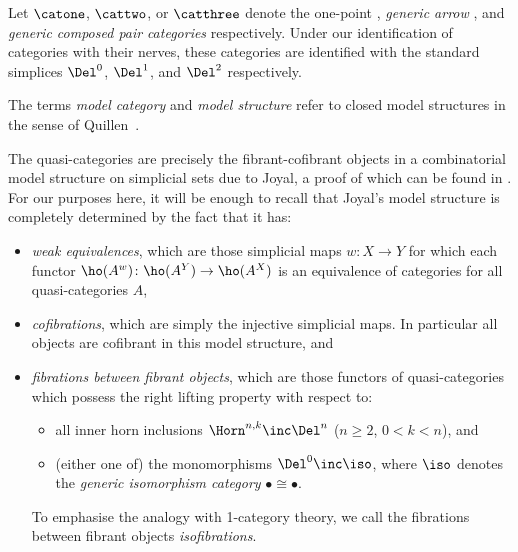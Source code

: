 \begin{ntn}
 Let $\catone$, $\cattwo$, or $\catthree$  denote the one-point \fbox{$\bullet$}, \emph{generic arrow} \fbox{$\bullet\to\bullet$}, and \emph{generic composed pair} \fbox{$\bullet\to\bullet\to\bullet$} \emph{categories} respectively. Under our identification of categories with their nerves, these categories are identified with the standard simplices $\Del^0$, $\Del^1$, and $\Del^2$ respectively.
\end{ntn}
    

The terms {\em model category\/} and {\em model structure\/}  refer to closed model structures in the sense of Quillen~\cite{Quillen:1967:Model}.

    \begin{rec}\label{rec:qmc-quasicat}
    The quasi-categories are precisely the fibrant-cofibrant objects in a combinatorial model structure on simplicial sets due to Joyal, a proof of which can be found in \cite[\S 6.5]{Verity:2007:wcs1}.
       For our purposes here, it will be enough to recall that Joyal's model structure is completely determined by the fact that it has: 
      \begin{itemize}
      \item {\em weak equivalences\/}, which are  those simplicial maps $w\colon X\to Y$ for which each functor $\ho(A^w)\colon\ho(A^Y)\to\ho(A^X)$ is an equivalence of categories for all quasi-categories $A$,
      \item {\em cofibrations\/}, which are simply the injective simplicial maps. In particular all objects are cofibrant in this model structure, and
      \item {\em fibrations between fibrant objects\/}, which are those functors of quasi-categories which possess the right lifting property with respect to:
      \begin{itemize}
      \item all inner horn inclusions $\Horn^{n,k}\inc\Del^n$ ($n\geq 2$, $0<k<n$), and
      \item (either one of) the monomorphisms $\Del^0\inc \iso$, where $\iso$ denotes the {\em generic isomorphism category\/} $\bullet\cong\bullet$.
      \end{itemize}
      To emphasise the analogy with 1-category theory, we call the fibrations between fibrant objects {\em isofibrations}.
      \end{itemize}
    \end{rec}

